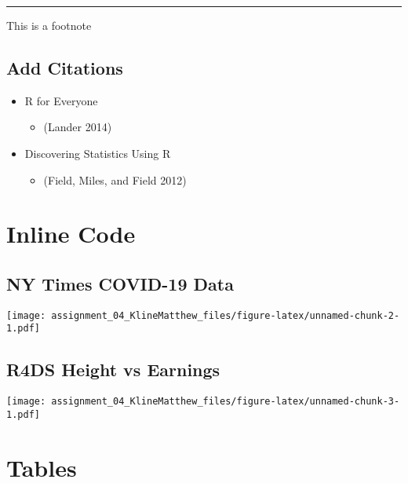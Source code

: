 \documentclass[
]{article}
\providecommand{\tightlist}{%
  \setlength{\itemsep}{0pt}\setlength{\parskip}{0pt}}
\begin{document}
\begin{center}\rule{0.5\linewidth}{0.5pt}\end{center}

This is a footnote

\hypertarget{add-citations}{%
\subsection{Add Citations}\label{add-citations}}

\begin{itemize}
\tightlist
\item
  R for Everyone

  \begin{itemize}
  \tightlist
  \item
    (Lander 2014)
  \end{itemize}
\item
  Discovering Statistics Using R

  \begin{itemize}
  \tightlist
  \item
    (Field, Miles, and Field 2012)
  \end{itemize}
\end{itemize}

\hypertarget{inline-code}{%
\section{Inline Code}\label{inline-code}}

\hypertarget{ny-times-covid-19-data}{%
\subsection{NY Times COVID-19 Data}\label{ny-times-covid-19-data}}

\texttt{[image: assignment\_04\_KlineMatthew\_files/figure-latex/unnamed-chunk-2-1.pdf]}

\hypertarget{r4ds-height-vs-earnings}{%
\subsection{R4DS Height vs Earnings}\label{r4ds-height-vs-earnings}}

\texttt{[image: assignment\_04\_KlineMatthew\_files/figure-latex/unnamed-chunk-3-1.pdf]}

\hypertarget{tables}{%
\section{Tables}\label{tables}}
\end{document}

